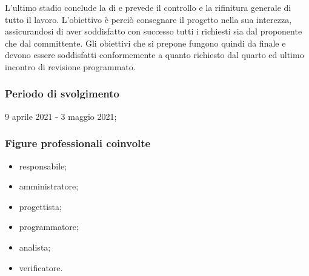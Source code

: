 L'ultimo stadio conclude la  di  e prevede il controllo e la rifinitura generale di tutto il lavoro. L'obiettivo è perciò consegnare il progetto nella sua interezza, assicurandosi di aver soddisfatto con successo tutti i  richiesti sia dal proponente che dal committente. Gli obiettivi che si prepone fungono quindi da  finale e devono essere soddisfatti conformemente a quanto richiesto dal quarto ed ultimo incontro di revisione programmato.
        
        \subsubsection{Periodo di svolgimento}
        9 aprile 2021 - 3 maggio 2021;
        
        \subsubsection{Figure professionali coinvolte}
            \begin{itemize}
                \item responsabile;
                \item amministratore;
                \item progettista;
                \item programmatore;
                \item analista;
                \item verificatore.
            \end{itemize}

